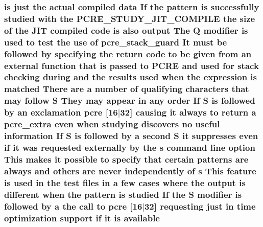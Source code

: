 \subsubsection[{\texorpdfstring{available}{available}}]{ {\bf is} just the actual {\bf compiled} {\bf data} If the {\bf pattern} {\bf is} successfully {\bf studied} {\bf with} the {\bf P\+C\+R\+E\+\_\+\+S\+T\+U\+D\+Y\+\_\+\+J\+I\+T\+\_\+\+C\+O\+M\+P\+I\+LE} the {\bf size} {\bf of} the J\+IT {\bf compiled} {\bf code} {\bf is} also {\bf output} The Q {\bf modifier} {\bf is} {\bf used} {\bf to} test the use {\bf of} {\bf pcre\+\_\+stack\+\_\+guard} It must {\bf be} followed by {\bf specifying} the return {\bf code} {\bf to} {\bf be} {\bf given} {\bf from} an external {\bf function} that {\bf is} passed {\bf to} {\bf P\+C\+RE} and {\bf used} for {\bf stack} checking during and the {\bf results} {\bf used} when the {\bf expression} {\bf is} {\bf matched} There {\bf are} {\bf a} {\bf number} {\bf of} qualifying {\bf characters} that may follow {\bf S} They may appear {\bf in} {\bf any} {\bf order} If {\bf S} {\bf is} followed by an exclamation {\bf pcre} \mbox{[}16$\vert$32\mbox{]} causing {\bf it} always {\bf to} return {\bf a} {\bf pcre\+\_\+extra} even when {\bf studying} discovers no useful information If {\bf S} {\bf is} followed by {\bf a} {\bf second} {\bf S} {\bf it} suppresses even {\bf if} {\bf it} was requested externally by the {\bf s} {\bf command} {\bf line} {\bf option} This makes {\bf it} {\bf possible} {\bf to} specify that certain {\bf patterns} {\bf are} always and others {\bf are} never independently {\bf of} {\bf s} This {\bf feature} {\bf is} {\bf used} {\bf in} the test {\bf files} {\bf in} {\bf a} few {\bf cases} {\bf where} the {\bf output} {\bf is} different when the {\bf pattern} {\bf is} {\bf studied} If the {\bf S} {\bf modifier} {\bf is} followed by {\bf a} the call {\bf to} {\bf pcre} \mbox{[}16$\vert$32\mbox{]} requesting just {\bf in} {\bf time} optimization {\bf support} {\bf if} {\bf it} {\bf is} available}\hypertarget{pcretest_8txt_a4535630baf343422449d0c4d3f6d0ae7}{}\label{pcretest_8txt_a4535630baf343422449d0c4d3f6d0ae7}
